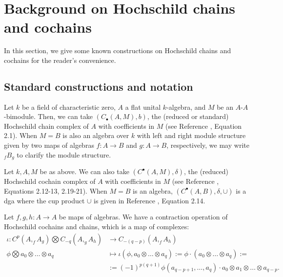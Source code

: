 \chapter{Background on Hochschild chains and cochains}
\label{chap:hochschild}
In this section, we give some known 
constructions on Hochschild chains and 
cochains for the reader's convenience. 
%
\section{Standard constructions and notation}
Let $k$ be a field of characteristic zero, 
$A$ a flat unital $k$-algebra, and $M$ be an 
$A$-$A$-bimodule. Then, we can take 
$(C_\bullet(A,M), b)$, the 
(reduced or standard) Hochschild chain 
complex of $A$ 
with coefficients in $M$ (see Reference 
\cite{T}, Equation 2.1). When $M = B$ is also 
an algebra over $k$ with left and right 
module structure given by two maps of algebras 
$f:A \to B$ and $g:A \to B$, respectively, 
we may write $_fB_g$ to clarify 
the module structure.

Let $k, A, M$ be as above. We can also 
take $(C^\bullet(A,M), \delta)$, the 
(reduced) Hochschild cochain complex of $A$ 
with coefficients in $M$ (see Reference 
\cite{T}, Equations 2.12-13, 2.19-21). When $M=B$ is 
an algebra, $(C^\bullet(A,B), \delta, \cup)$ 
is a dga where the cup product $\cup$ is 
given in Reference \cite{T}, Equation 2.14.

Let $f,g,h:A \to A$ be maps of algebras. 
We have a contraction operation of Hochschild 
cochains and chains, which is a map of complexes:
\begin{align*}
\iota: C^p(A, _fA_g) \bigotimes C_{-q}(A, _gA_h) 
&\longrightarrow 
C_{-(q-p)}(A, _fA_h) \\
\phi \bigotimes a_0\otimes \dots \otimes a_q 
&\mapsto 
\iota(\phi, a_0\otimes \dots \otimes a_q)
:= \phi \cdot (a_0\otimes \dots \otimes a_q) :=\\
&:=
(-1)^{p(q+1)}
\phi(a_{q-p+1},\dots,a_q)\cdot a_0 
\otimes a_1 \otimes \dots \otimes a_{q-p}.
\end{align*}


